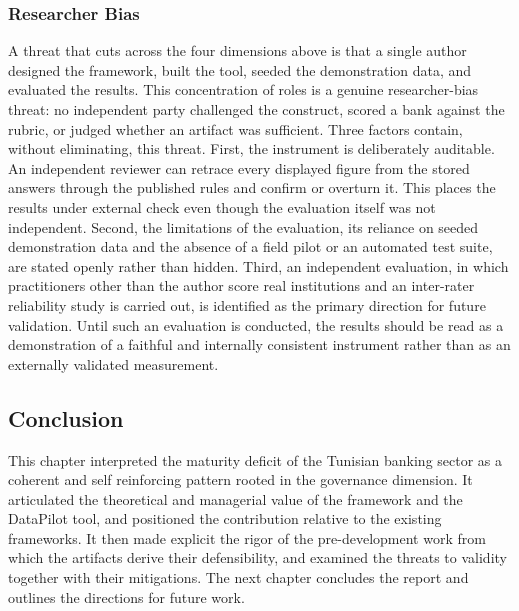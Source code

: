 \subsubsection{Researcher Bias}

A threat that cuts across the four dimensions above is that a single author designed the framework, built the tool, seeded the demonstration data, and evaluated the results. This concentration of roles is a genuine researcher-bias threat: no independent party challenged the construct, scored a bank against the rubric, or judged whether an artifact was sufficient. Three factors contain, without eliminating, this threat. First, the instrument is deliberately auditable. An independent reviewer can retrace every displayed figure from the stored answers through the published rules and confirm or overturn it. This places the results under external check even though the evaluation itself was not independent. Second, the limitations of the evaluation, its reliance on seeded demonstration data and the absence of a field pilot or an automated test suite, are stated openly rather than hidden. Third, an independent evaluation, in which practitioners other than the author score real institutions and an inter-rater reliability study is carried out, is identified as the primary direction for future validation. Until such an evaluation is conducted, the results should be read as a demonstration of a faithful and internally consistent instrument rather than as an externally validated measurement.

\subsection{Conclusion}

This chapter interpreted the maturity deficit of the Tunisian banking sector as a coherent and self reinforcing pattern rooted in the governance dimension. It articulated the theoretical and managerial value of the framework and the DataPilot tool, and positioned the contribution relative to the existing frameworks. It then made explicit the rigor of the pre-development work from which the artifacts derive their defensibility, and examined the threats to validity together with their mitigations. The next chapter concludes the report and outlines the directions for future work.
